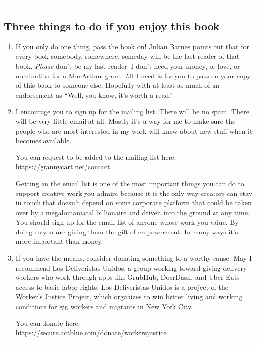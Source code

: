 \documentclass[
]{scrbook}
\begin{document}
\newpage

\ %

\newpage


\small

\begin{center}\rule{0.5\linewidth}{0.5pt}\end{center}

\hypertarget{three-things-to-do-if-you-enjoy-this-book}{%
\subsection{Three things to do if you enjoy this
book}\label{three-things-to-do-if-you-enjoy-this-book}}

\begin{enumerate}
\def\labelenumi{\arabic{enumi}.}
\item
  If you only do one thing, pass the book on! Julian Barnes points out
  that for every book somebody, somewhere, someday will be the last
  reader of that book. \emph{Please} don't be my last reader! I don't
  need your money, or love, or nomination for a MacArthur grant. All I
  need is for you to pass on your copy of this book to someone else.
  Hopefully with at least as much of an endorsement as ``Well, you know,
  it's worth a read.''
\item
  I encourage you to sign up for the mailing list. There will be no
  spam. There will be very little email at all. Mostly it's a way for me
  to make sure the people who are most interested in my work will know
  about new stuff when it becomes available.

  You can request to be added to the mailing list here:\\
  https://grannycart.net/contact

  Getting on the email list is one of the most important things you can
  do to support creative work you admire because it is the only way
  creators can stay in touch that doesn't depend on some corporate
  platform that could be taken over by a megalomaniacal billionaire and
  driven into the ground at any time. You should sign up for the email
  list of anyone whose work you value. By doing so you are giving them
  the gift of empowerment. In many ways it's more important than money.
\item
  If you have the means, consider donating something to a worthy cause.
  May I recommend Los Deliveristas Unidos, a group working toward giving
  delivery workers who work through apps like GrubHub, DoorDash, and
  Uber Eats access to basic labor rights. Los Deliveristas Unidos is a
  project of the
  \href{http://www.workersjustice.org/workers-justice-project}{Worker's
  Justice Project}, which organizes to win better living and working
  conditions for gig workers and migrants in New York City.

  You can donate here:\\
  https://secure.actblue.com/donate/workersjustice
\end{enumerate}

\begin{center}\rule{0.5\linewidth}{0.5pt}\end{center}

\backmatter
\end{document}

